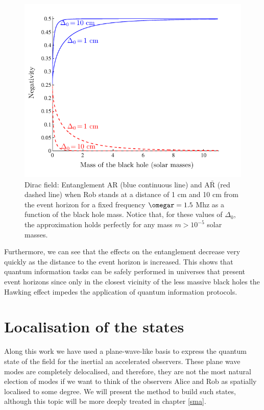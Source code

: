 \begin{figure}[h]
\begin{center}
\includegraphics[width=.85\textwidth]{1cm1Mhzf}
\caption{Dirac field: Entanglement AR (blue continuous line) and
 $\text{A}\bar{\text{R}}$ (red dashed line) when Rob stands at a
 distance of 1 cm and 10 cm from the event horizon for a fixed frequency
  $\omegar=1.5$ Mhz as a function of the black hole mass.
  Notice that, for these values of $\Delta_0$, the approximation holds perfectly for any mass $m>10^{-5}$ solar masses.}
\label{realf}
\end{center}
\end{figure}


Furthermore, we can see that the effects on the entanglement decrease
very quickly as the distance to the event horizon is increased. This shows
that quantum information tasks can be safely performed in universes that
present event horizons since only in the closest vicinity of the less massive
black holes the Hawking effect impedes the application of quantum
information protocols.



\section{Localisation of the states}\label{newsec5}

Along this work we have used a plane-wave-like basis to express the quantum state of the field for the inertial an accelerated observers. These plane wave modes are completely delocalised, and therefore, they are not the most natural election of modes if we want to think of the observers Alice and Rob as spatially localised to some degree. We will present the method to build such states, although this topic will be more deeply treated in chapter \ref{sma}.

